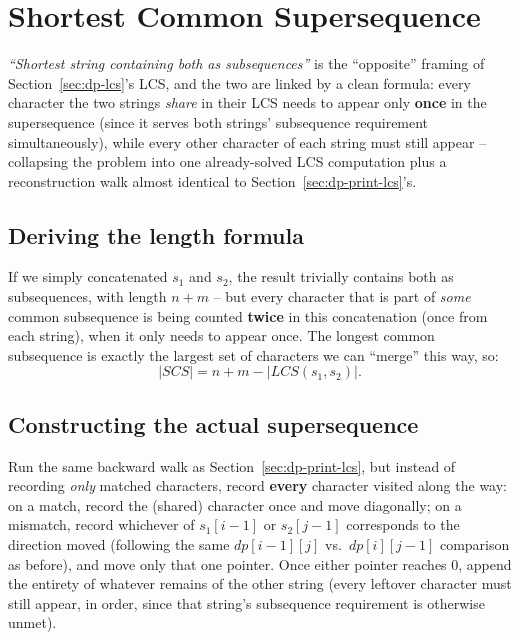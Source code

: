 \section{Shortest Common Supersequence}
\label{sec:dp-shortest-common-supersequence}


\begin{patternbox}
\emph{``Shortest string containing both as subsequences''} is the
``opposite'' framing of Section~\ref{sec:dp-lcs}'s LCS, and the two are
linked by a clean formula: every character the two strings \emph{share}
in their LCS needs to appear only \textbf{once} in the supersequence
(since it serves both strings' subsequence requirement simultaneously),
while every other character of each string must still appear --
collapsing the problem into one already-solved LCS computation plus a
reconstruction walk almost identical to Section~\ref{sec:dp-print-lcs}'s.
\end{patternbox}

\subsection*{Deriving the length formula}

If we simply concatenated $s_1$ and $s_2$, the result trivially contains
both as subsequences, with length $n+m$ -- but every character that is
part of \emph{some} common subsequence is being counted \textbf{twice}
in this concatenation (once from each string), when it only needs to
appear once. The longest common subsequence is exactly the largest set
of characters we can ``merge'' this way, so:
\[
  |\textit{SCS}| = n + m - |\textit{LCS}(s_1, s_2)|.
\]

\subsection*{Constructing the actual supersequence}

Run the same backward walk as Section~\ref{sec:dp-print-lcs}, but
instead of recording \emph{only} matched characters, record
\textbf{every} character visited along the way: on a match, record the
(shared) character once and move diagonally; on a mismatch, record
whichever of $s_1[i-1]$ or $s_2[j-1]$ corresponds to the direction moved
(following the same $\textit{dp}[i-1][j]$ vs.\ $\textit{dp}[i][j-1]$
comparison as before), and move only that one pointer. Once either
pointer reaches $0$, append the entirety of whatever remains of the
other string (every leftover character must still appear, in order,
since that string's subsequence requirement is otherwise unmet).

